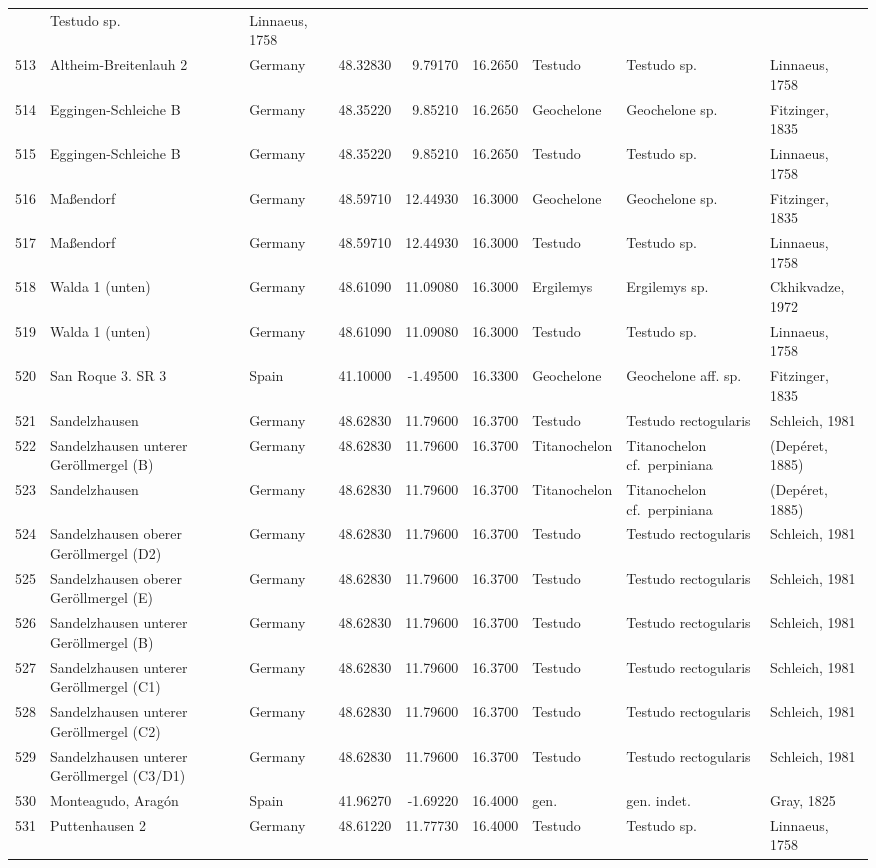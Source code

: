 \begin{landscape}
{\begin{longtable}[]{@{}lllrrrlll@{}}
& Testudo sp. & Linnaeus, 1758\tabularnewline
513 & Altheim-Breitenlauh 2 & Germany & 48.32830 & 9.79170 & 16.2650 &
Testudo & Testudo sp. & Linnaeus, 1758\tabularnewline
514 & Eggingen-Schleiche B & Germany & 48.35220 & 9.85210 & 16.2650 &
Geochelone & Geochelone sp. & Fitzinger, 1835\tabularnewline
515 & Eggingen-Schleiche B & Germany & 48.35220 & 9.85210 & 16.2650 &
Testudo & Testudo sp. & Linnaeus, 1758\tabularnewline
516 & Maßendorf & Germany & 48.59710 & 12.44930 & 16.3000 & Geochelone &
Geochelone sp. & Fitzinger, 1835\tabularnewline
517 & Maßendorf & Germany & 48.59710 & 12.44930 & 16.3000 & Testudo &
Testudo sp. & Linnaeus, 1758\tabularnewline
518 & Walda 1 (unten) & Germany & 48.61090 & 11.09080 & 16.3000 &
Ergilemys & Ergilemys sp. & Ckhikvadze, 1972\tabularnewline
519 & Walda 1 (unten) & Germany & 48.61090 & 11.09080 & 16.3000 &
Testudo & Testudo sp. & Linnaeus, 1758\tabularnewline
520 & San Roque 3. SR 3 & Spain & 41.10000 & -1.49500 & 16.3300 &
Geochelone & Geochelone aff. sp. & Fitzinger, 1835\tabularnewline
521 & Sandelzhausen & Germany & 48.62830 & 11.79600 & 16.3700 & Testudo
& Testudo rectogularis & Schleich, 1981\tabularnewline
522 & Sandelzhausen unterer Geröllmergel (B) & Germany & 48.62830 &
11.79600 & 16.3700 & Titanochelon & Titanochelon cf.~perpiniana &
(Depéret, 1885)\tabularnewline
523 & Sandelzhausen & Germany & 48.62830 & 11.79600 & 16.3700 &
Titanochelon & Titanochelon cf.~perpiniana & (Depéret,
1885)\tabularnewline
524 & Sandelzhausen oberer Geröllmergel (D2) & Germany & 48.62830 &
11.79600 & 16.3700 & Testudo & Testudo rectogularis & Schleich,
1981\tabularnewline
525 & Sandelzhausen oberer Geröllmergel (E) & Germany & 48.62830 &
11.79600 & 16.3700 & Testudo & Testudo rectogularis & Schleich,
1981\tabularnewline
526 & Sandelzhausen unterer Geröllmergel (B) & Germany & 48.62830 &
11.79600 & 16.3700 & Testudo & Testudo rectogularis & Schleich,
1981\tabularnewline
527 & Sandelzhausen unterer Geröllmergel (C1) & Germany & 48.62830 &
11.79600 & 16.3700 & Testudo & Testudo rectogularis & Schleich,
1981\tabularnewline
528 & Sandelzhausen unterer Geröllmergel (C2) & Germany & 48.62830 &
11.79600 & 16.3700 & Testudo & Testudo rectogularis & Schleich,
1981\tabularnewline
529 & Sandelzhausen unterer Geröllmergel (C3/D1) & Germany & 48.62830 &
11.79600 & 16.3700 & Testudo & Testudo rectogularis & Schleich,
1981\tabularnewline
530 & Monteagudo, Aragón & Spain & 41.96270 & -1.69220 & 16.4000 & gen.
& gen. indet. & Gray, 1825\tabularnewline
531 & Puttenhausen 2 & Germany & 48.61220 & 11.77730 & 16.4000 & Testudo
& Testudo sp. & Linnaeus, 1758\tabularnewline

\end{longtable}}
\end{landscape}
